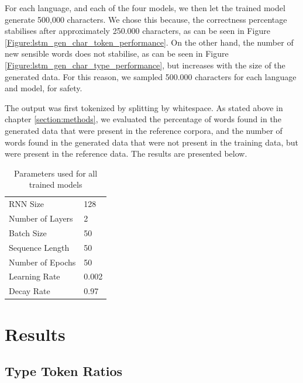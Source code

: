 \documentclass[11pt,a4paper,twoside,openright]{scrbook}
\begin{document}
For each language, and each of the four models, we then let the trained model generate 500,000 characters. We chose this because, the correctness percentage stabilises after approximately 250.000 characters, as can be seen in Figure \ref{Figure:lstm_gen_char_token_performance}. On the other hand, the number of new sensible words does not stabilise, as can be seen in Figure \ref{Figure:lstm_gen_char_type_performance}, but increases with the size of the generated data. For this reason, we sampled 500.000 characters for each language and model, for safety. 

The output was first tokenized by splitting by whitespace. As stated above in chapter \ref{section:methods}, we evaluated the percentage of words found in the generated data that were present in the reference corpora, and the number of words found in the generated data that were not present in the training data, but were present in the reference data. The results are presented below.

\begin{table}
\centering
\caption{Parameters used for all trained models}
\label{table:parameters}
\begin{tabular}{|l|l|}
        \hline
        RNN Size         & 128   \\
        Number of Layers & 2     \\ 
        Batch Size       & 50    \\ 
        Sequence Length  & 50    \\ 
        Number of Epochs & 50    \\ 
        Learning Rate    & 0.002 \\ 
        Decay Rate       & 0.97  \\
        \hline
    \end{tabular}
\end{table}


\chapter{Results} 

\section{Type Token Ratios}
\end{document}
